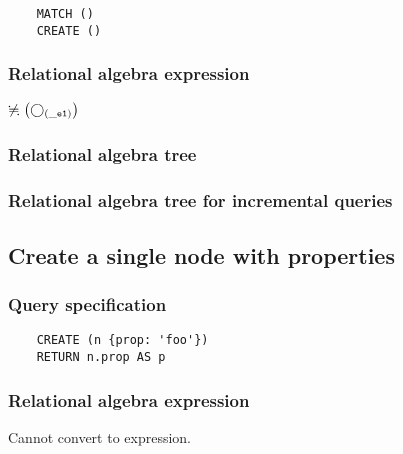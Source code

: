 	\begin{lstlisting}
	MATCH ()
	CREATE ()
	\end{lstlisting}


	\subsubsection*{Relational algebra expression}

	$\alldifferent{} \left(\getvertices{\_e1}{}\right)$

	\subsubsection*{Relational algebra tree}


	\subsubsection*{Relational algebra tree for incremental queries}

	\subsection{Create a single node with properties}

	\subsubsection*{Query specification}

	\begin{lstlisting}
	CREATE (n {prop: 'foo'})
	RETURN n.prop AS p
	\end{lstlisting}


	\subsubsection*{Relational algebra expression}

	Cannot convert to expression.

